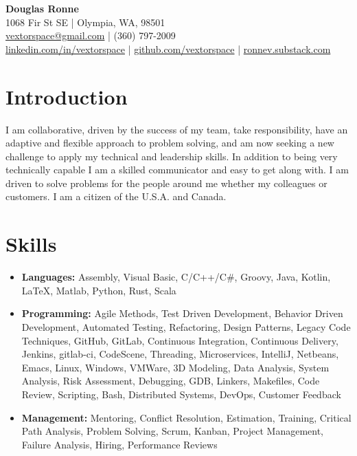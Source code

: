 \documentclass[letter,11pt]{article}
\begin{document}
\begin{center}
    {\Huge \textbf{Douglas Ronne}}\\
    \vspace{2mm}
    1068 Fir St SE | Olympia, WA, 98501\\
    \href{mailto:vextorspace@gmail.com}{vextorspace@gmail.com} | (360) 797-2009\\
    \href{https://www.linkedin.com/in/vextorspace}{linkedin.com/in/vextorspace} | \href{https://github.com/vextorspace}{github.com/vextorspace} | \href{https://ronnev.substack.com}{ronnev.substack.com}
\end{center}

\section*{Introduction}

I am collaborative, driven by the success of my team, take responsibility, have an adaptive and flexible approach to problem solving, and am now seeking a new challenge to apply my technical and leadership skills. In addition to being very technically capable I am a skilled communicator and easy to get along with. I am driven to solve problems for the people around me whether my colleagues or customers. I am a citizen of the U.S.A. and Canada.

\section*{Skills}
\begin{itemize}[leftmargin=*,itemsep=0pt, parsep=0pt,label=$\diamond$]
\item \textbf{Languages:} Assembly, Visual Basic, C/C++/C\#, Groovy, Java, Kotlin, LaTeX, Matlab, Python, Rust, Scala
\item \textbf{Programming:} Agile Methods, Test Driven Development, Behavior Driven Development, Automated Testing, Refactoring, Design Patterns, Legacy Code Techniques, GitHub, GitLab, Continuous Integration, Continuous Delivery, Jenkins, gitlab-ci, CodeScene, Threading, Microservices, IntelliJ, Netbeans, Emacs, Linux, Windows, VMWare, 3D Modeling, Data Analysis, System Analysis, Risk Assessment, Debugging, GDB, Linkers, Makefiles, Code Review, Scripting, Bash, Distributed Systems, DevOps, Customer Feedback
\item \textbf{Management:} Mentoring, Conflict Resolution, Estimation, Training, Critical Path Analysis, Problem Solving, Scrum, Kanban, Project Management, Failure Analysis, Hiring, Performance Reviews
\end{itemize}
\end{document}
